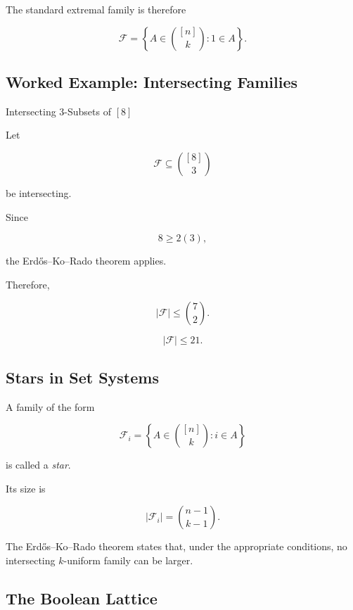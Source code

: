 The standard extremal family is therefore

\[
\boxed{
\mathcal{F}
=
\left\{
A\in\binom{[n]}{k}:1\in A
\right\}.
}
\]

\subsection{Worked Example: Intersecting Families}
\label{subsec:worked-ekr}

\begin{workedexamplebox}{Intersecting \(3\)-Subsets of \([8]\)}

Let

\[
\mathcal{F}
\subseteq
\binom{[8]}{3}
\]

be intersecting.

Since

\[
8\geq2(3),
\]

the Erd\H{o}s--Ko--Rado theorem applies.

Therefore,

\[
|\mathcal{F}|
\leq
\binom{7}{2}.
\]

\begin{answerbox}
\[
\boxed{
|\mathcal{F}|\leq21.
}
\]
\end{answerbox}

\end{workedexamplebox}

\subsection{Stars in Set Systems}
\label{subsec:stars-set-systems}

A family of the form

\[
\mathcal{F}_i
=
\left\{
A\in\binom{[n]}{k}:i\in A
\right\}
\]

is called a \emph{star}.

Its size is

\[
\boxed{
|\mathcal{F}_i|
=
\binom{n-1}{k-1}.
}
\]

The Erd\H{o}s--Ko--Rado theorem states that, under the appropriate
conditions, no intersecting \(k\)-uniform family can be larger.

\subsection{The Boolean Lattice}
\label{subsec:boolean-lattice-extremal}

